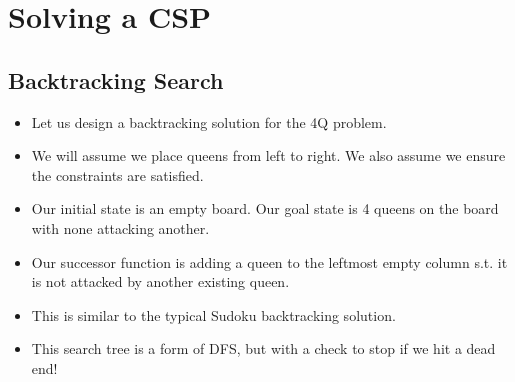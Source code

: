 \documentclass{article}
\begin{document}
\section{Solving a CSP}
\subsection{Backtracking Search}
\begin{itemize}
    \item Let us design a backtracking solution for the 4Q problem.
    \item We will assume we place queens from left to right.  We also assume we ensure the constraints are satisfied.
    \item Our initial state is an empty board.  Our goal state is 4 queens on the board with none attacking another.
    \item Our successor function is adding a queen to the leftmost empty column s.t. it is not attacked by another existing queen.
    \item This is similar to the typical Sudoku backtracking solution.
    \item This search tree is a form of DFS, but with a check to stop if we hit a dead end!
\end{itemize}
\end{document}
